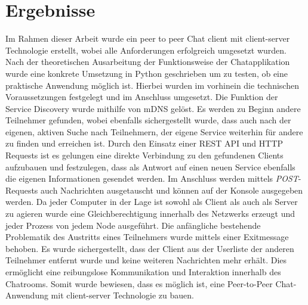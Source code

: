 \section{Ergebnisse}
Im Rahmen dieser Arbeit wurde ein peer to peer Chat client mit client-server Technologie erstellt, wobei alle Anforderungen erfolgreich umgesetzt wurden.
Nach der theoretischen Ausarbeitung der Funktionsweise der Chatapplikation wurde eine konkrete Umsetzung in Python geschrieben um zu testen,
ob eine praktische Anwendung möglich ist.
Hierbei wurden im vorhinein die technischen Voraussetzungen festgelegt und im Anschluss umgesetzt. 
Die Funktion der Service Discovery wurde mithilfe von mDNS gelöst. Es werden zu Beginn andere Teilnehmer gefunden, wobei ebenfalls sichergestellt wurde, 
dass auch nach der eigenen, aktiven Suche nach Teilnehmern, der eigene Service weiterhin für 
andere zu finden und erreichen ist. 
Durch den Einsatz einer REST API und HTTP Requests ist es gelungen eine direkte Verbindung zu den gefundenen Clients aufzubauen und festzulegen, dass als Antwort auf einen neuen Service ebenfalls die eigenen Informationen 
gesendet werden. Im Anschluss werden mittels \emph{POST}-Requests auch Nachrichten ausgetauscht und können auf der Konsole ausgegeben werden. 
Da jeder Computer in der Lage ist sowohl als Client als auch als Server zu agieren wurde eine Gleichberechtigung innerhalb des Netzwerks erzeugt und jeder Prozess von jedem Node ausgeführt.
Die anfängliche bestehende Problematik des Austritts eines Teilnehmers wurde mittels einer Exitmessage behoben. 
Es wurde sichergestellt, dass der Client aus der Userliste der anderen Teilnehmer entfernt wurde und keine weiteren Nachrichten mehr erhält. 
Dies ermöglicht eine reibungslose Kommunikation und Interaktion innerhalb des Chatrooms. 
Somit wurde bewiesen, dass es möglich ist, eine Peer-to-Peer Chat-Anwendung mit client-server Technologie zu bauen.
